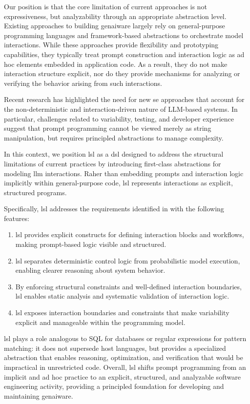 \documentclass[manuscript,screen]{acmart}
\begin{document}
Our position is that the core limitation of current approaches is not expressiveness, but analyzability through an appropriate abstraction level. 
Existing approaches to building \ac{genai}ware largely rely on general-purpose programming languages and framework-based abstractions to orchestrate model interactions. 
While these approaches provide flexibility and prototyping capabilities, they typically treat prompt construction and interaction logic as ad hoc elements embedded in application code. 
As a result, they do not make interaction structure explicit, nor do they provide mechanisms for analyzing or verifying the behavior arising from such interactions.

Recent research has highlighted the need for new \ac{se} approaches that account for the non-deterministic and interaction-driven nature of LLM-based systems. 
In particular, challenges related to variability, testing, and developer experience suggest that prompt programming cannot be viewed merely as string manipulation, but requires principled abstractions to manage complexity.

In this context, we position \ac{lsl} as a \ac{dsl} designed to address the structural limitations of current practices by introducing first-class abstractions for modeling \ac{llm} interactions. 
Raher than embedding prompts and interaction logic implicitly within general-purpose code, \ac{lsl} represents interactions as explicit, structured programs.

Specifically, \ac{lsl} addresses the requirements identified in  with the following features:
\begin{enumerate}[label=F\arabic*]
    \item \ac{lsl} provides explicit constructs for defining interaction blocks and workflows, making prompt-based logic visible and structured.
    \item \ac{lsl} separates deterministic control logic from probabilistic model execution, enabling clearer reasoning about system behavior.
    \item By enforcing structural constraints and well-defined interaction boundaries, \ac{lsl} enables static analysis and systematic validation of interaction logic.
    \item \ac{lsl} exposes interaction boundaries and constraints that make variability explicit and manageable within the programming model.
\end{enumerate}

\ac{lsl} plays a role analogous to SQL for databases or regular expressions for pattern matching: it does not supersede host languages, but provides a specialized abstraction that enables reasoning, optimization, and verification that would be impractical in unrestricted code.
Overall, \ac{lsl} shifts prompt programming from an implicit and ad hoc practice to an explicit, structured, and analyzable software engineering activity, providing a principled foundation for developing and maintaining \ac{genai}ware.
\end{document}
